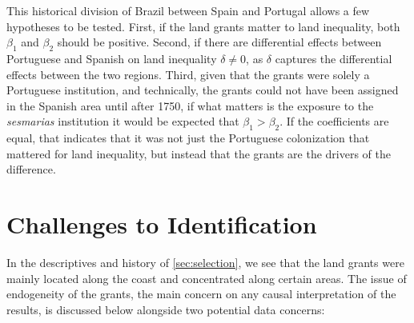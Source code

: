 \documentclass[11pt]{article}
\begin{document}
This historical division of Brazil between Spain and Portugal allows a few hypotheses to be tested.
First, if the land grants matter to land inequality, both $\beta_1$ and $\beta_2$ should be positive.
Second, if there are differential effects between Portuguese and Spanish on land inequality $\delta \neq 0$, as $\delta$ captures the differential effects between the two regions.
Third, given that the grants were solely a Portuguese institution, and technically, the grants could not have been assigned in the Spanish area until after 1750, if what matters is the exposure to the \textit{sesmarias} institution it would be expected that $\beta_1 > \beta_2$. 
If the coefficients are equal, that indicates that it was not just the Portuguese colonization that mattered for land inequality, but instead that the grants are the drivers of the difference.


\section{Challenges to Identification}
\label{sec:challenges}

In the descriptives and history of \autoref{sec:selection}, we see that the land grants were mainly located along the coast and concentrated along certain areas.
The issue of endogeneity of the grants, the main concern on any causal interpretation of the results, is discussed below alongside two potential data concerns:
\end{document}
